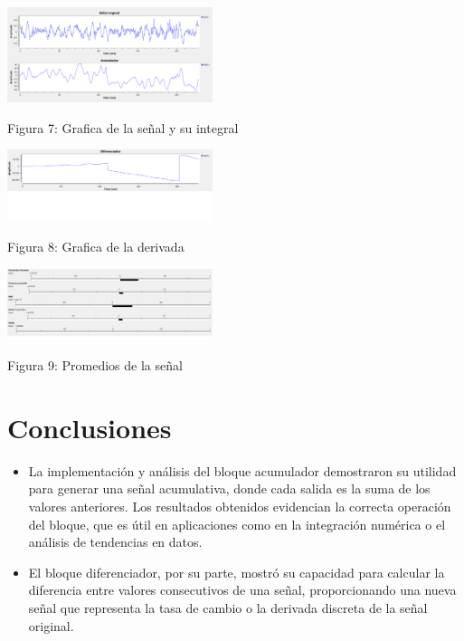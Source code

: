 \documentclass{journal}[IEEEtran, twocolumn]             %
\begin{document}
\begin{multicols}{2}
  \begin{center}
    \includegraphics[width=0.45\textwidth]{figs/F7.png}
    \caption{Figura 7: Grafica de la señal y su integral}
    \end{center}
    
      \begin{center}
    \includegraphics[width=0.45\textwidth]{figs/F8.png}
    \caption{Figura 8: Grafica de la derivada}
    \end{center}
    
      \begin{center}
    \includegraphics[width=0.45\textwidth]{figs/F9.png}
    \caption{Figura 9: Promedios de la señal}
    \end{center}


\section{Conclusiones}

\begin{itemize}
    
    \item La implementación y análisis del bloque acumulador demostraron su utilidad para generar una señal acumulativa, donde cada salida es la suma de los valores anteriores. Los resultados obtenidos evidencian la correcta operación del bloque, que es útil en aplicaciones como en la integración numérica o el análisis de tendencias en datos.
    
    \item El bloque diferenciador, por su parte, mostró su capacidad para calcular la diferencia entre valores consecutivos de una señal, proporcionando una nueva señal que representa la tasa de cambio o la derivada discreta de la señal original.
    

\end{itemize}
\end{multicols}
\end{document}
